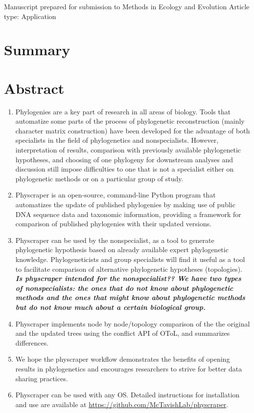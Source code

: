 \documentclass[]{article}
\author{}
\date{\vspace{-2.5em}}
\begin{document}
Manuscript prepared for submission to Methods in Ecology and Evolution
Article type: Application

\newpage

\hypertarget{summary}{%
\section{Summary}\label{summary}}

\hypertarget{abstract}{%
\section{Abstract}\label{abstract}}

\begin{enumerate}
\def\labelenumi{\arabic{enumi}.}
\item
  Phylogenies are a key part of research in all areas of biology. Tools that automatize
  some parts of the process of phylogenetic reconstruction (mainly character matrix construction)
  have been developed for the advantage of both specialists in the field of phylogenetics and nonspecialists.
  However, interpretation of results, comparison with previously available phylogenetic
  hypotheses, and choosing of one phylogeny for downstream analyses and discussion still impose difficulties
  to one that is not a specialist either on phylogenetic methods or on a particular group of study.
\item
  Physcraper is an open‐source, command-line Python program that automatizes the update of published
  phylogenies by making use of public DNA sequence data and taxonomic information,
  providing a framework for comparison of published phylogenies with their updated versions.
\item
  Physcraper can be used by the nonspecialist, as a tool to generate phylogenetic
  hypothesis based on already available expert phylogenetic knowledge.
  Phylogeneticists and group specialists will find it useful as a tool to facilitate comparison
  of alternative phylogenetic hypotheses (topologies).
  \textbf{\emph{Is physcraper intended for the nonspecialist?? We have two types of nonspecialists:
  the ones that do not know about phylogenetic methods and the ones that might know
  about phylogenetic methods but do not know much about a certain biological group.}}
\item
  Physcraper implements node by node/topology comparison of the the original and the updated
  trees using the conflict API of OToL, and summarizes differences.
\item
  We hope the physcraper workflow demonstrates the benefits of opening results in phylogenetics and encourages researchers to strive for better data sharing practices.
\item
  Physcraper can be used with any OS. Detailed instructions for installation and
  use are available at \url{https://github.com/McTavishLab/physcraper}.
\end{enumerate}
\end{document}
